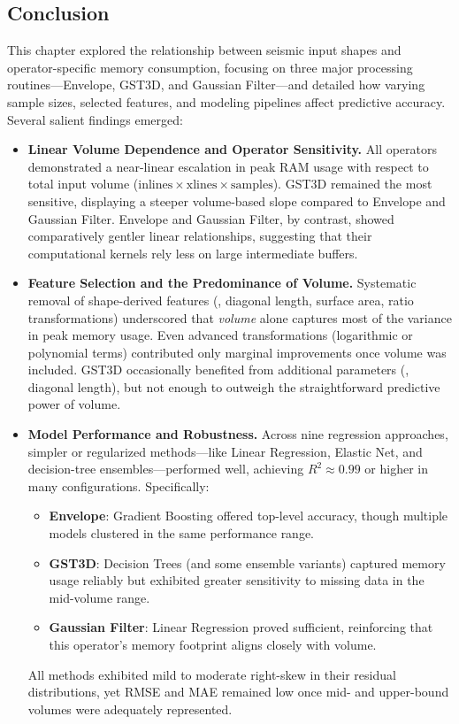 \subsection{Conclusion}
\label{subsec:pmc-conclusion}

This chapter explored the relationship between seismic input shapes and operator-specific memory consumption, focusing on three major processing routines—Envelope, \ac{GST3D}, and Gaussian Filter—and detailed how varying sample sizes, selected features, and modeling pipelines affect predictive accuracy.
Several salient findings emerged:

\begin{itemize}
    \item \textbf{Linear Volume Dependence and Operator Sensitivity.}
    All operators demonstrated a near-linear escalation in peak \ac{RAM} usage with respect to total input volume (\( \text{inlines} \times \text{xlines} \times \text{samples} \)).
    \ac{GST3D} remained the most sensitive, displaying a steeper volume-based slope compared to Envelope and Gaussian Filter.
    Envelope and Gaussian Filter, by contrast, showed comparatively gentler linear relationships, suggesting that their computational kernels rely less on large intermediate buffers.

    \item \textbf{Feature Selection and the Predominance of Volume.}
    Systematic removal of shape-derived features (\eg, diagonal length, surface area, ratio transformations) underscored that \emph{volume} alone captures most of the variance in peak memory usage.
    Even advanced transformations (logarithmic or polynomial terms) contributed only marginal improvements once volume was included.
    \ac{GST3D} occasionally benefited from additional parameters (\eg, diagonal length), but not enough to outweigh the straightforward predictive power of volume.

    \item \textbf{Model Performance and Robustness.}
    Across nine regression approaches, simpler or regularized methods—like Linear Regression, Elastic Net, and decision-tree ensembles—performed well, achieving \(R^2 \approx 0.99\) or higher in many configurations.
    Specifically:
    \begin{itemize}
        \item \textbf{Envelope}: Gradient Boosting offered top-level accuracy, though multiple models clustered in the same performance range.
        \item \textbf{\ac{GST3D}}: Decision Trees (and some ensemble variants) captured memory usage reliably but exhibited greater sensitivity to missing data in the mid-volume range.
        \item \textbf{Gaussian Filter}: Linear Regression proved sufficient, reinforcing that this operator’s memory footprint aligns closely with volume.
    \end{itemize}
    All methods exhibited mild to moderate right-skew in their residual distributions, yet \ac{RMSE} and \ac{MAE} remained low once mid- and upper-bound volumes were adequately represented.


\end{itemize}
